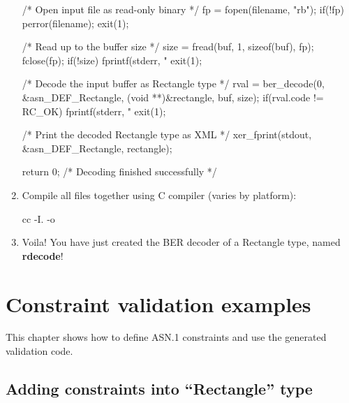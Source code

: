 \documentclass[english,oneside,12pt]{book}
\begin{document}
\begin{enumerate}
\begin{codesample}[basicstyle=\scriptsize\listingfont]
{    /* Open input file as read-only binary */
    fp = fopen(filename, "rb");
    if(!fp) {
        perror(filename);
        exit(1);
    }

    /* Read up to the buffer size */
    size = fread(buf, 1, sizeof(buf), fp);
    fclose(fp);
    if(!size) {
        fprintf(stderr, "%
        exit(1);
    }

    /* Decode the input buffer as Rectangle type */
    rval = ber_decode(0, &asn_DEF_Rectangle, (void **)&rectangle, buf, size);
    if(rval.code != RC_OK) {
        fprintf(stderr, "%
        exit(1);
    }

    /* Print the decoded Rectangle type as XML */
    xer_fprint(stdout, &asn_DEF_Rectangle, rectangle);

    return 0; /* Decoding finished successfully */
}
\end{codesample}
\item Compile all files together using C compiler (varies by platform):

\begin{bash}
cc -I. -o %
\end{bash}
\item Voila! You have just created the BER decoder of a Rectangle type,
named \textbf{rdecode}!
\end{enumerate}

\chapter{Constraint validation examples}

This chapter shows how to define ASN.1 constraints and use the generated
validation code.


\section{Adding constraints into ``Rectangle'' type}
\end{document}
